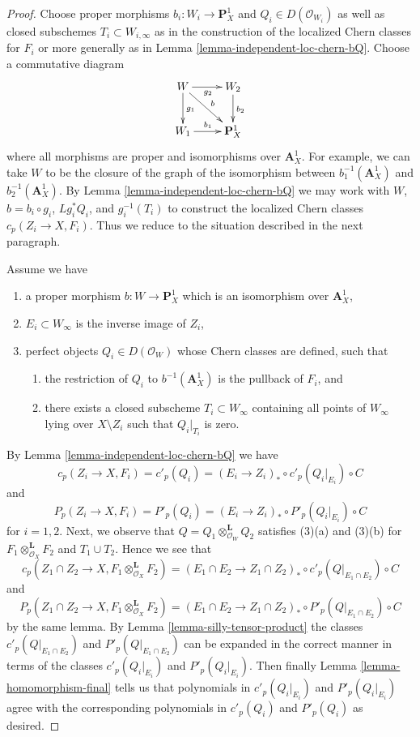 \documentclass[10pt,a4paper]{amsart}
\theoremstyle{plain}
\theoremstyle{definition}
\theoremstyle{remark}
\numberwithin{equation}{subsection}
\begin{document}
\begin{proof}
Choose proper morphisms $b_i : W_i \to \mathbf{P}^1_X$ and
$Q_i \in D(\mathcal{O}_{W_i})$ as well as closed subschemes
$T_i \subset W_{i, \infty}$ as in the construction of
the localized Chern classes for $F_i$ or more generally as in
Lemma \ref{lemma-independent-loc-chern-bQ}. Choose a commutative
diagram
$$
\xymatrix{
W \ar[d]^{g_1} \ar[rd]^b \ar[r]_{g_2} & W_2 \ar[d]^{b_2} \\
W_1 \ar[r]^{b_1} & \mathbf{P}^1_X
}
$$
where all morphisms are proper and isomorphisms over
$\mathbf{A}^1_X$. For example, we can take $W$ to be the closure
of the graph of the isomorphism between
$b_1^{-1}(\mathbf{A}^1_X)$ and $b_2^{-1}(\mathbf{A}^1_X)$.
By Lemma \ref{lemma-independent-loc-chern-bQ} we may work with
$W$, $b = b_i \circ g_i$, $Lg_i^*Q_i$, and
$g_i^{-1}(T_i)$ to construct the localized Chern classes
$c_p(Z_i \to X, F_i)$. Thus we reduce to the situation described
in the next paragraph.

\medskip\noindent
Assume we have
\begin{enumerate}
\item a proper morphism $b : W \to \mathbf{P}^1_X$ which is an isomorphism
over $\mathbf{A}^1_X$,
\item $E_i \subset W_\infty$ is the inverse image of $Z_i$,
\item perfect objects $Q_i \in D(\mathcal{O}_W)$ whose Chern classes
are defined, such that
\begin{enumerate}
\item the restriction of $Q_i$ to $b^{-1}(\mathbf{A}^1_X)$ is
the pullback of $F_i$, and
\item there exists a closed subscheme $T_i \subset W_\infty$ containing
all points of $W_\infty$ lying over $X \setminus Z_i$ such that
$Q_i|_{T_i}$ is zero.
\end{enumerate}
\end{enumerate}
By Lemma \ref{lemma-independent-loc-chern-bQ} we have
$$
c_p(Z_i \to X, F_i) = c'_p(Q_i) =
(E_i \to Z_i)_* \circ c'_p(Q_i|_{E_i}) \circ C
$$
and
$$
P_p(Z_i \to X, F_i) = P'_p(Q_i) =
(E_i \to Z_i)_* \circ P'_p(Q_i|_{E_i}) \circ C
$$
for $i = 1, 2$. Next, we observe that
$Q = Q_1 \otimes_{\mathcal{O}_W}^\mathbf{L} Q_2$
satisfies (3)(a) and (3)(b) for $F_1 \otimes_{\mathcal{O}_X}^\mathbf{L} F_2$
and $T_1 \cup T_2$. Hence we see that
$$
c_p(Z_1 \cap Z_2 \to X, F_1 \otimes_{\mathcal{O}_X}^\mathbf{L} F_2) =
(E_1 \cap E_2 \to Z_1 \cap Z_2)_* \circ
c'_p(Q|_{E_1 \cap E_2}) \circ C
$$
and
$$
P_p(Z_1 \cap Z_2 \to X, F_1 \otimes_{\mathcal{O}_X}^\mathbf{L} F_2) =
(E_1 \cap E_2 \to Z_1 \cap Z_2)_* \circ
P'_p(Q|_{E_1 \cap E_2}) \circ C
$$
by the same lemma. By Lemma \ref{lemma-silly-tensor-product}
the classes $c'_p(Q|_{E_1 \cap E_2})$ and $P'_p(Q|_{E_1 \cap E_2})$
can be expanded in the correct manner in terms of the classes
$c'_p(Q_i|_{E_i})$ and $P'_p(Q_i|_{E_i})$. Then finally
Lemma \ref{lemma-homomorphism-final}
tells us that polynomials in $c'_p(Q_i|_{E_i})$ and $P'_p(Q_i|_{E_i})$
agree with the corresponding polynomials in
$c'_p(Q_i)$ and $P'_p(Q_i)$ as desired.
\end{proof}
\end{document}
